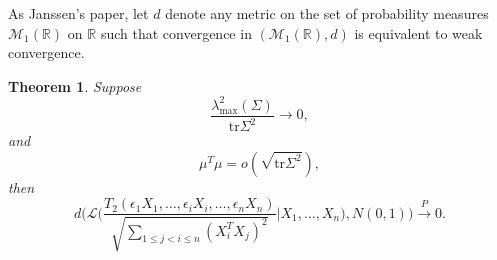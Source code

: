 \documentclass[review]{elsarticle}
\theoremstyle{plain}
\newtheorem{theorem}{\quad\quad Theorem}
\theoremstyle{definition}
\theoremstyle{remark}
\begin{document}
As Janssen's paper, let $d$ denote any metric on the set of probability measures $\mathcal{M}_1(\mathbb{R})$ on $\mathbb{R}$ such that convergence in $(\mathcal{M}_1(\mathbb{R}),d)$ is equivalent to weak convergence.
\begin{theorem}
     Suppose
    \begin{equation}\label{chenCondition}
        \frac{\lambda_{\max}^2(\Sigma)}{\mathrm{tr}\Sigma^2}\to 0,
    \end{equation}
    and
    \begin{equation}
        \mu^T\mu=o(\sqrt{\mathrm{tr}\Sigma^2}),
    \end{equation}
    then
    \begin{equation}
        d\Big(\mathcal{L}\Big(\frac{T_2(\epsilon_1 X_1,\ldots, \epsilon_i X_i,\ldots,\epsilon_n X_n)}{\sqrt{\sum_{1\leq j<i\leq n}{(X_i^T X_j)}^2}}\Big|X_1,\ldots,X_n\Big),
        N(0,1)\Big)
        \xrightarrow{P}0.
    \end{equation}
\end{theorem}
\end{document}

